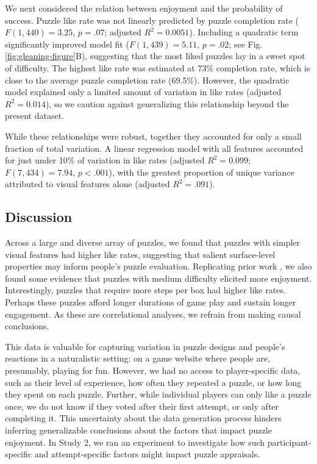 \documentclass[10pt,letterpaper]{article}
\begin{document}
We next considered the relation between enjoyment and the probability of success. Puzzle like rate was not linearly predicted by puzzle completion rate ($F(1,440)=3.25$, $p=.07$; adjusted $R^{2}=0.0051$). %
Including a quadratic term significantly improved model fit ($F(1,439)=5.11$, $p=.02$; see Fig. \ref{fig:gleaning-figure}B), suggesting that the most liked puzzles lay in a sweet spot of difficulty. The highest like rate was estimated at 73\% completion rate, which is close to the average puzzle completion rate (69.5\%). However, the quadratic model explained only a limited amount of variation in like rates (adjusted $R^{2}=0.014$), so we caution against generalizing this relationship beyond the present dataset.

While these relationships were robust, together they accounted for only a small fraction of total variation. A linear regression model with all features accounted for just under 10\% of variation in like rates (adjusted $R^2= 0.099$; $F(7,434)=7.94$, $p<.001$), with the greatest proportion of unique variance attributed to visual features alone (adjusted $R^2=.091$).

\subsection{Discussion}

Across a large and diverse array of puzzles, we found that puzzles with simpler visual features had higher like rates, suggesting that salient surface-level properties may inform people's puzzle evaluation. 
Replicating prior work \cite{braendle2024fun},
we also found some evidence that puzzles with medium difficulty elicited more enjoyment. Interestingly, puzzles that require more steps per box had higher like rates. Perhaps these puzzles afford longer durations of game play and sustain longer engagement. As these are correlational analyses, we refrain from making causal conclusions. 

This data is valuable for capturing variation in puzzle designs and people's reactions in a naturalistic setting: on a game website where people are, presumably, playing for fun. However, we had no access to player-specific data, such as their level of experience, how often they repeated a puzzle, or how long they spent on each puzzle. Further, while individual players can only like a puzzle once, we do not know if they voted after their first attempt, or only after completing it. This uncertainty about the data generation process hinders inferring generalizable conclusions about the factors that impact puzzle enjoyment. In Study 2, we ran an experiment to investigate how such participant-specific and attempt-specific factors might impact puzzle appraisals. 
\end{document}
